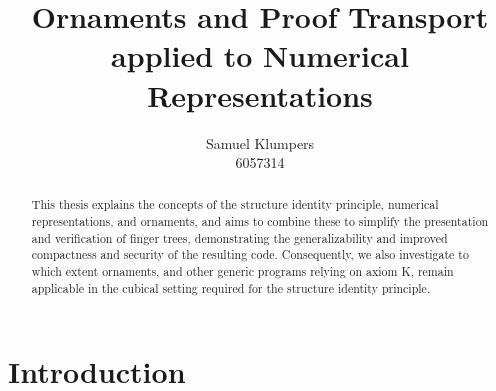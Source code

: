 \documentclass{article}
\title{Ornaments and Proof Transport applied to Numerical Representations}
\author{Samuel Klumpers\\6057314}
\theoremstyle{plain}%
\theoremstyle{definition}
\newcommand{\towrite}[1]{\par\textcolor{blue}{Write here about: ``#1''}\par}
\begin{document}
\maketitle


\begin{abstract}
This thesis explains the concepts of the structure identity principle, numerical representations, and ornaments, and aims to combine these to simplify the presentation and verification of finger trees, demonstrating the generalizability and improved compactness and security of the resulting code. Consequently, we also investigate to which extent ornaments, and other generic programs relying on axiom K, remain applicable in the cubical setting required for the structure identity principle.
\end{abstract}

\tableofcontents

\begin{comment}
\section*{Outline}
In this document I propose a master thesis project, in which I will investigate and attempt to counter the obstacles one can encounter when replacing one datastructure with a more complicated one, focussing on how we can retain or reuse properties and proofs from the simpler datastructure.

We introduce the topics of proof transport, ornamentation, and numerical representation by presenting problems and explaining how these topics can be applied to them. Following up on these problems, we make our research question more precise, list some related questions, and propose methods by which we may answer these questions. We then overview related research and existing theory, highlighting the problems they originally solved, and how we may apply them to our research question. Next, we summarize preliminary work done for this project. Finally, we propose a planning, explaining more precisely how we split the research question into parts and what subproblems we intend to solve working towards answering our research question.
\end{comment}


\section{Introduction}\label{sec:intro}

\end{document}
